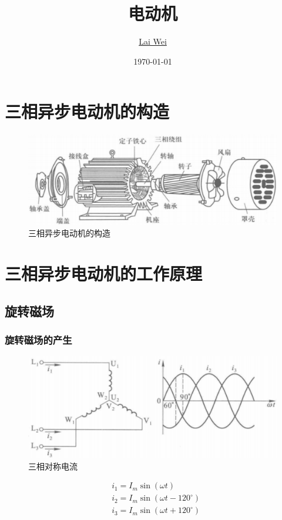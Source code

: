 \documentclass[12pt]{article}
\title{电动机}
\author{\href{mailto:lai-wei@whu.edu.cn}{Lai Wei}}
\date{\today}
\begin{document}
\maketitle

\section{三相异步电动机的构造}

\begin{figure}[!h]
    \centering
    \includegraphics[width = .75\textwidth]{graphics/Screenshot 2025-09-15 at 18.24.13.png}
    \caption{三相异步电动机的构造}
    \label{三相异步电动机的构造}
\end{figure}

\section{三相异步电动机的工作原理}

\subsection{旋转磁场}

\subsubsection{旋转磁场的产生}

\begin{figure}[!h]
    \centering
    \includegraphics[width = .6\textwidth]{graphics/Screenshot 2025-09-15 at 18.43.21.png}
    \caption{三相对称电流}
    \label{三相对称电流}
\end{figure}

\begin{equation*}
    \begin{aligned}
        & i_1 = I_m \sin(\omega t) \\
        & i_2 = I_m \sin(\omega t - 120^{\circ}) \\
        & i_3 = I_m \sin(\omega t + 120^{\circ})
    \end{aligned}
\end{equation*}
\end{document}
